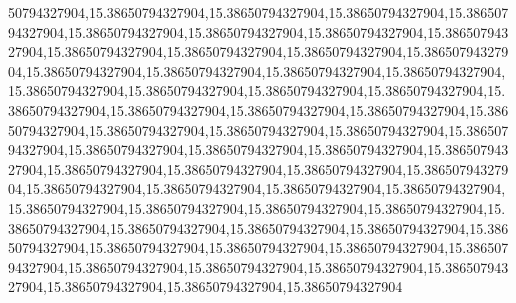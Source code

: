 50794327904,15.38650794327904,15.38650794327904,15.38650794327904,15.38650794327904,15.38650794327904,15.38650794327904,15.38650794327904,15.38650794327904,15.38650794327904,15.38650794327904,15.38650794327904,15.38650794327904,15.38650794327904,15.38650794327904,15.38650794327904,15.38650794327904,15.38650794327904,15.38650794327904,15.38650794327904,15.38650794327904,15.38650794327904,15.38650794327904,15.38650794327904,15.38650794327904,15.38650794327904,15.38650794327904,15.38650794327904,15.38650794327904,15.38650794327904,15.38650794327904,15.38650794327904,15.38650794327904,15.38650794327904,15.38650794327904,15.38650794327904,15.38650794327904,15.38650794327904,15.38650794327904,15.38650794327904,15.38650794327904,15.38650794327904,15.38650794327904,15.38650794327904,15.38650794327904,15.38650794327904,15.38650794327904,15.38650794327904,15.38650794327904,15.38650794327904,15.38650794327904,15.38650794327904,15.38650794327904,15.38650794327904,15.38650794327904,15.38650794327904,15.38650794327904,15.38650794327904,15.38650794327904,15.38650794327904,15.38650794327904,15.38650794327904
